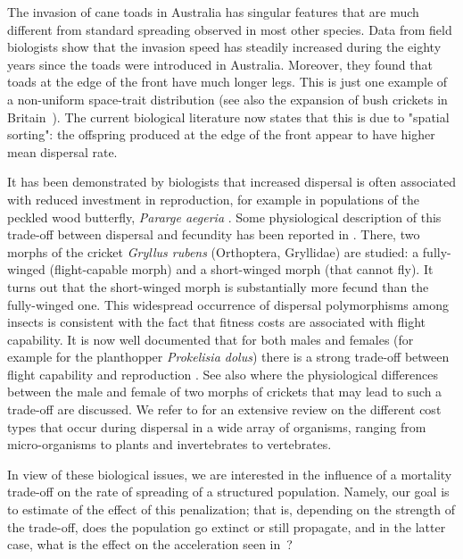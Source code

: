 \documentclass[11pt]{article}    %
\begin{document}
The invasion of cane toads in Australia has singular features that are much different from standard spreading observed in most other
species. Data from field biologists \cite{phillips2006invasion, Shine} show that the invasion speed has steadily increased 
during the eighty years since the toads were introduced in Australia.  Moreover, they found that toads at the edge of the front have much longer legs.  This is just one example of a non-uniform space-trait 
distribution (see also the expansion of bush crickets in Britain~\cite{Thomas}). The current biological literature now states that this is due to "spatial sorting": the offspring produced at the edge of the front appear to have higher mean dispersal rate. 

It has been demonstrated by biologists that increased dispersal is often associated with reduced investment in reproduction, for example in populations of the peckled wood butterfly, \textit{Pararge aegeria} \cite{Hughes}. Some physiological description of this trade-off between dispersal and fecundity has been reported in \cite{Mole}. There, two morphs of the cricket \textit{Gryllus rubens} (Orthoptera, Gryllidae) are studied: a fully-winged (flight-capable morph) and a short-winged morph (that cannot fly).  It turns out that the short-winged morph is substantially more fecund than the fully-winged one. This widespread occurrence of dispersal polymorphisms among insects is consistent with the fact that fitness costs are associated with flight capability. It is now well documented that for both males and females (for example for the planthopper \textit{Prokelisia dolus}) there is a strong trade-off between flight capability and reproduction \cite{Langellotto}. See also \cite{Guerra} where the physiological differences between the male and female of two morphs of crickets that may lead to such a trade-off are discussed. We refer to \cite{Bonte} for an extensive review on the different cost types that occur during dispersal in a wide array of organisms, ranging from micro-organisms to plants and invertebrates to vertebrates.


In view of these biological issues, we are interested in the influence of a mortality trade-off on the rate of spreading of a structured population.  Namely, our goal is to estimate of the effect of this penalization; that is, depending on the strength of the trade-off, does the population go extinct or still propagate, and in the latter case, what is the effect on the acceleration seen in~\cite{BerestyckiMouhotRaoul,BHR_Acceleration}?
\end{document}
